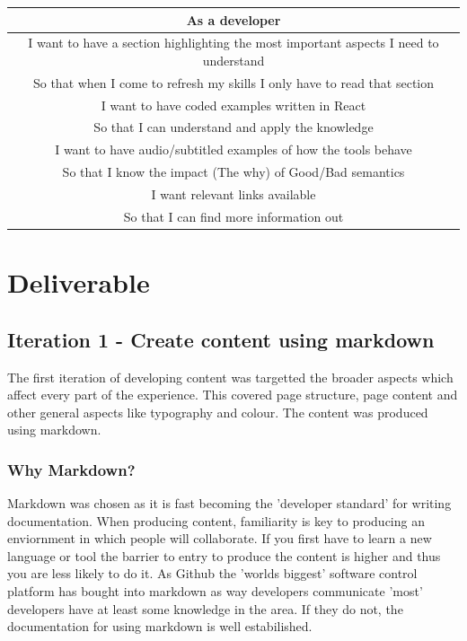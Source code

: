 \begin{center}
 \begin{tabular}{| c |}
 \hline
 As a developer \\
 \hline
 I want to have a section highlighting the most important aspects I need to
 understand \\
 So that when I come to refresh my skills I only have to read that section  \\
 \hline
 I want to have coded examples written in React \\
 So that I can understand and apply the knowledge \\
 \hline
 I want to have audio/subtitled examples of how the tools behave  \\
 So that I know the impact (The why) of Good/Bad semantics  \\
 \hline
 I want relevant links available  \\
 So that I can find more information out  \\
 \hline
\end{tabular}
\end{center}

\section{Deliverable}
\subsection{Iteration 1 - Create content using markdown}
The first iteration of developing content was targetted the broader aspects
which affect every part of the experience. This covered page structure,
page content and other general aspects like typography and colour. The content was produced
using markdown.

\subsubsection{Why Markdown?}
Markdown was chosen as it is fast becoming the 'developer standard' for writing
documentation. When producing content, familiarity is key to producing an
enviornment in which people will collaborate. If you first have to
learn a new language or tool the barrier to entry to produce the content is
higher and thus you are less likely to do it. As Github the 'worlds biggest'
software control platform has bought into markdown as way developers communicate
'most' developers have at least some knowledge in the area. If they do not,
the documentation for using markdown is well estabilished.

